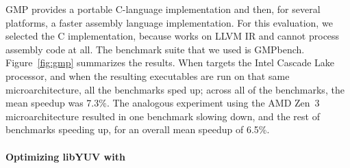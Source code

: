 GMP provides a portable C-language implementation and then, for
several platforms, a faster assembly language implementation.
%
For this evaluation, we selected the C implementation, because \minotaur{}
works on LLVM IR and cannot process assembly code at all.
%
The benchmark suite that we used is
GMPbench.%
%
Figure~\ref{fig:gmp} summarizes the results.
%
When \minotaur{} targets the Intel Cascade Lake processor, and when the
resulting executables are run on that same microarchitecture,
all the benchmarks sped up;
across all of the benchmarks, the mean speedup was 7.3\%.
%
The analogous experiment using the AMD Zen~3 microarchitecture
resulted in one benchmark slowing down, and the rest of benchmarks
speeding up, for an overall mean speedup of 6.5\%.


\paragraph{Optimizing libYUV with \minotaur{}}

